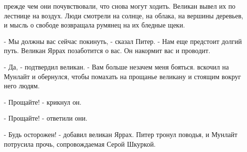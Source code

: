 прежде чем они почувствовали, что снова могут ходить. Великан вывел их 
по лестнице на воздух. Люди смотрели на солнце, на облака, на вершины 
деревьев, и мысль о свободе возвращала румянец на их бледные щеки.
\par- Мы должны вас сейчас покинуть, - сказал Питер. - Нам еще 
предстоит долгий путь. Великан Яррах позаботится о вас. Он накормит 
вас и проводит.
\par- Да, - подтвердил великан. - Вам больше незачем меня бояться.
 вскочил на Мунлайт и обернулся, чтобы помахать на прощанье 
великану и стоящим вокруг него людям.
\par- Прощайте! - крикнул он.
\par- Прощайте! - ответили они.
\par- Будь осторожен! - добавил великан Яррах. Питер тронул поводья, и 
Мунлайт потрусила прочь, сопровождаемая Серой Шкуркой.
